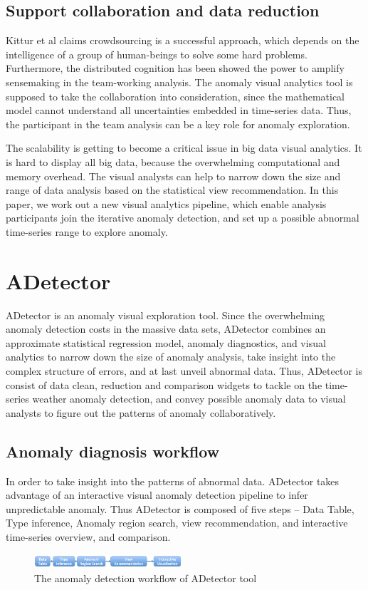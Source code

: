 \documentclass{vgtc}                          %
\begin{document}
\subsection{Support collaboration and data reduction}

	Kittur et al\cite{kittur2008crowdsourcing} claims crowdsourcing is a successful approach, which depends on the intelligence of a group of human-beings to solve some hard problems. Furthermore, the distributed cognition\cite{liu2008distributed} has been showed the power to amplify sensemaking in the team-working analysis. The anomaly visual analytics tool is supposed to take the collaboration into consideration, since the mathematical model cannot understand all uncertainties embedded in time-series data. Thus, the participant in the team analysis can be a key role for anomaly exploration.
	 
	The scalability is getting to become a critical issue in big data visual analytics. It is hard to display all big data, because the overwhelming computational and memory overhead. The visual analysts can help to narrow down the size and range of data analysis based on the statistical view recommendation. In this paper, we work out a new visual analytics pipeline, which enable analysis participants join the iterative anomaly detection, and set up a possible abnormal time-series range to explore anomaly.


\section{ADetector}

ADetector is an anomaly visual exploration tool. Since the overwhelming anomaly detection costs in the massive data sets, ADetector combines an approximate statistical regression model, anomaly diagnostics, and visual analytics to narrow down the size of anomaly analysis, take insight into the complex structure of errors, and at last unveil abnormal data. Thus, ADetector is consist of data clean, reduction and comparison widgets to tackle on the time-series weather anomaly detection, and convey possible anomaly data to visual analysts to figure out the patterns of anomaly collaboratively.

\subsection{Anomaly diagnosis workflow}

In order to take insight into the patterns of abnormal data. ADetector takes advantage of an interactive visual anomaly detection pipeline to infer unpredictable anomaly. Thus ADetector is composed of five steps -- Data Table, Type inference, Anomaly region search, view recommendation, and interactive time-series overview, and comparison.
 \begin{figure}[htb]
	\centering
  \includegraphics[width=0.49\textwidth]{workflow.png}
  \caption{The anomaly detection workflow of ADetector tool}
\end{figure}
\end{document}
